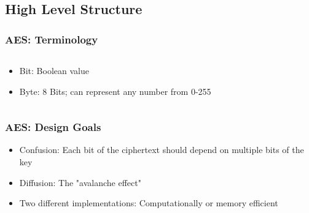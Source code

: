\documentclass[12pt]{beamer}
\begin{document}
\subsection{High Level Structure}

\begin{frame}
\frametitle{AES: Terminology}
\begin{columns}
\begin{column}{0.4\textwidth}
\begin{itemize}
\item<1-> Bit: Boolean value
\item<2-> Byte: 8 Bits; can represent any number from 0-255
\end{itemize}
\end{column}
\begin{column}{0.6\textwidth}


\end{column}
\end{columns}
\end{frame}

\begin{frame}
\frametitle{AES: Design Goals}
\begin{itemize}
\item<1-> Confusion: Each bit of the ciphertext should depend on multiple bits of the key
\item<2-> Diffusion: The "avalanche effect"
\item<3-> Two different implementations: Computationally or memory efficient
\end{itemize}
\end{frame}
\end{document}
